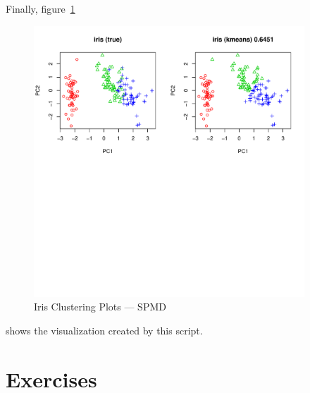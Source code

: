 Finally, figure~\ref{fig:iris_cluster_spmd}
\begin{figure}[h!bt]
  \centering
  \includegraphics[width=4in]{pbdDEMO-include/pics/dmat_plot.pdf}
  \caption{Iris Clustering Plots --- SPMD}
  \label{fig:iris_cluster_spmd}
\end{figure}
shows the visualization created by this script.




\section{Exercises}
\label{sec:pmclust_exercise}

